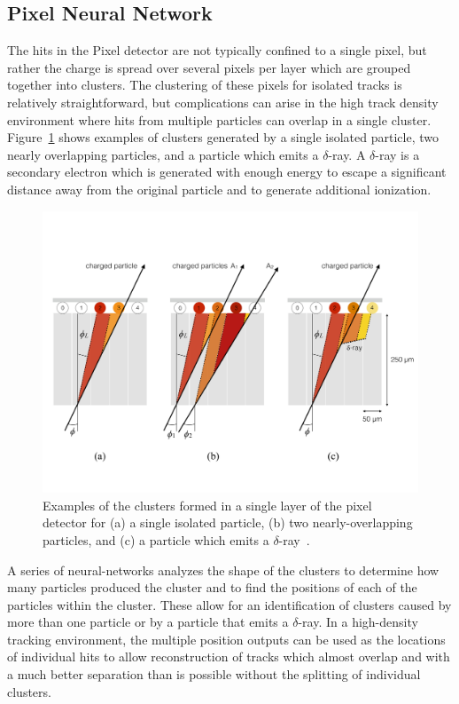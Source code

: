 \subsection{Pixel Neural Network}

The hits in the Pixel detector are not typically confined to a single pixel, but rather the charge is spread over several pixels per layer which are grouped together into clusters.
The clustering of these pixels for isolated tracks is relatively straightforward, but complications can arise in the high track density environment where hits from multiple particles can overlap in a single cluster.
Figure~\ref{fig:pixel_cluster_types} shows examples of clusters generated by a single isolated particle, two nearly overlapping particles, and a particle which emits a $\delta$-ray. 
A $\delta$-ray is a secondary electron which is generated with enough energy to escape a significant distance away from the original particle and to generate additional ionization.

\begin{figure}
\includegraphics[width=\fullfig]{figures/pixel_cluster_types.pdf}
\caption{Examples of the clusters formed in a single layer of the pixel detector for (a) a single isolated particle, (b) two nearly-overlapping particles, and (c) a particle which emits a $\delta$-ray~\cite{pixel_nn}.}
\label{fig:pixel_cluster_types}
\end{figure}

A series of neural-networks analyzes the shape of the clusters to determine how many particles produced the cluster and to find the positions of each of the particles within the cluster.
These allow for an identification of clusters caused by more than one particle or by a particle that emits a $\delta$-ray.
In a high-density tracking environment, the multiple position outputs can be used as the locations of individual hits to allow reconstruction of tracks which almost overlap and with a much better separation than is possible without the splitting of individual clusters.

